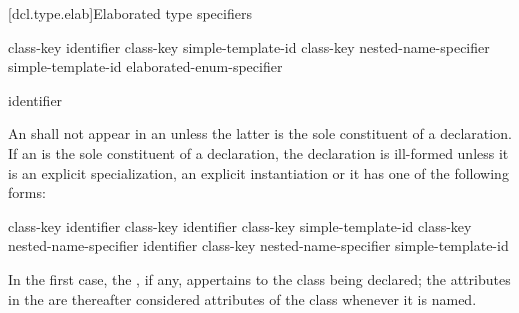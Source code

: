 [dcl.type.elab]{Elaborated type specifiers}%
%
%

\begin{bnf}
\br
    class-key   identifier\br
    class-key simple-template-id\br
    class-key nested-name-specifier  simple-template-id\br
    elaborated-enum-specifier
\end{bnf}

\begin{bnf}
\br
      identifier
\end{bnf}

\pnum
{}%
%
An  shall not appear in an 
unless the latter is the sole constituent of a declaration.
If an  is the sole constituent of a
declaration, the declaration is ill-formed unless it is an explicit
specialization, an explicit
instantiation or it has one of the following
forms:

\begin{ncsimplebnf}
class-key  identifier \terminal{;}\br
{} class-key \terminal{\opt{::}} identifier \terminal{;}\br
{} class-key \terminal{\opt{::}} simple-template-id \terminal{;}\br
{} class-key nested-name-specifier identifier \terminal{;}\br
{} class-key nested-name-specifier  simple-template-id \terminal{;}
\end{ncsimplebnf}

In the first case, the , if any, appertains
to the class being declared; the attributes in the
 are thereafter considered attributes of
the class whenever it is named.

